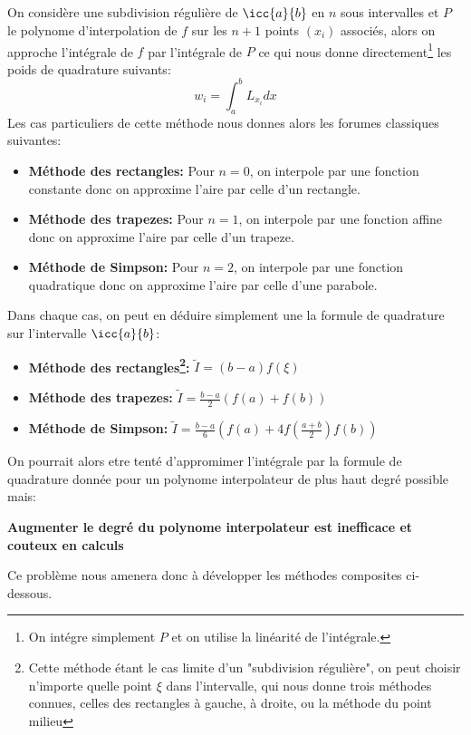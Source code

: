 \subsection*{}
On considère une subdivision régulière de \(\icc{a}{b}\) en \(n\) sous intervalles et \(P\) le polynome d'interpolation de \(f\) sur les \(n + 1\) points \((x_i)\) associés, alors on approche l'intégrale de \(f\) par l'intégrale de \(P\) ce qui nous donne directement\footnote[1]{On intégre simplement \(P\) et on utilise la linéarité de l'intégrale.} les poids de quadrature suivants:
\[
   w_i = \int_{a}^{b} L_{x_i} dx
\]
Les cas particuliers de cette méthode nous donnes alors les forumes classiques suivantes:
\begin{itemize}
   \item \textbf{Méthode des rectangles:} Pour \(n = 0\), on interpole par une fonction constante donc on approxime l'aire par celle d'un rectangle.
   \item \textbf{Méthode des trapezes:} Pour \(n = 1\), on interpole par une fonction affine donc on approxime l'aire par celle d'un trapeze.   
   \item \textbf{Méthode de Simpson:} Pour \(n = 2\), on interpole par une fonction quadratique donc on approxime l'aire par celle d'une parabole.
\end{itemize}
Dans chaque cas, on peut en déduire simplement une la formule de quadrature sur l'intervalle \(\icc{a}{b}\):
\begin{itemize}
   \item \textbf{Méthode des rectangles\footnote[2]{Cette méthode étant le cas limite d'un "subdivision régulière", on peut choisir n'importe quelle point \(\xi\) dans l'intervalle, qui nous donne trois méthodes connues, celles des rectangles à gauche, à droite, ou la méthode du point milieu}:} \(\widetilde{I} = (b - a)f(\xi)\) 
   \item \textbf{Méthode des trapezes:} \(\widetilde{I} = \frac{b - a}{2}(f(a) + f(b))\) 
   \item \textbf{Méthode de Simpson:}  \(\widetilde{I} = \frac{b - a}{6}(f(a) + 4f(\frac{a + b}{2}) f(b))\) 
\end{itemize}
On pourrait alors etre tenté d'appromimer l'intégrale par la formule de quadrature donnée pour un polynome interpolateur de plus haut degré possible mais:
\begin{center}
   \textbf{Augmenter le degré du polynome interpolateur est inefficace et couteux en calculs }
\end{center}
Ce problème nous amenera donc à développer les méthodes composites ci-dessous.


